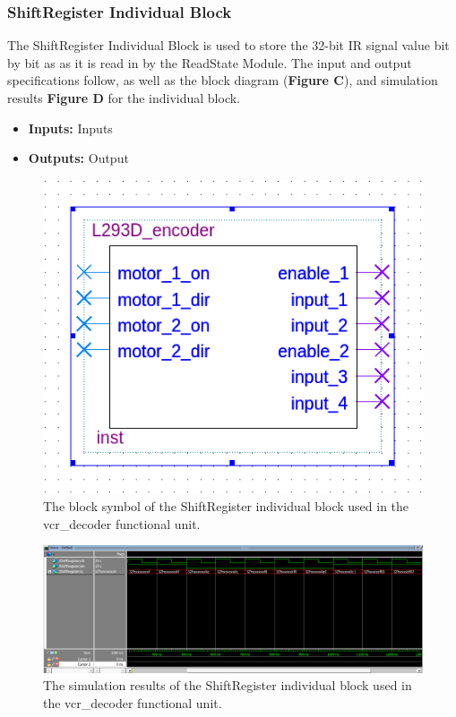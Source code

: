 \documentclass[a4paper]{article}
\begin{document}
\clearpage



\subsubsection{ShiftRegister Individual Block}
The ShiftRegister Individual Block is used to store the 32-bit IR signal value bit by bit as as it is read in by the ReadState Module. The input and output specifications follow, as well as the block diagram (\textbf{Figure C}), and simulation results \textbf{Figure D} for the individual block.
\begin{itemize}
  \item \textbf{Inputs:  } Inputs
  \item \textbf{Outputs: } Output
\end{itemize}
\begin{figure}[h]
  \centering
  \includegraphics[width=.48\textwidth]{symbols/individual_placeholder.png}
  \caption{The block symbol of the ShiftRegister individual block used in the vcr\_decoder functional unit.}
    \label{fig:individual-1-2-block}
\end{figure}
\begin{figure}[h]
  \centering
  \includegraphics[width=.98\textwidth]{sims/vcr_testing/moduleTests/shiftRegister/ShiftRegister_sim.png}
  \caption{The simulation results of the ShiftRegister individual block used in the vcr\_decoder functional unit.}
    \label{fig:individual-1-2-sim}
\end{figure}
\end{document}
